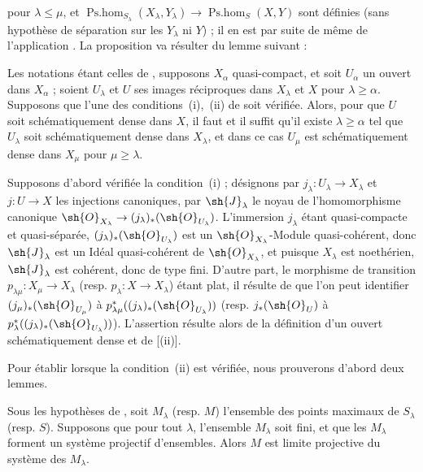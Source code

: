 pour $\lambda\leq\mu$, et $\operatorname{Ps.hom}_{S_\lambda}(X_\lambda,Y_\lambda)\to\operatorname{Ps.hom}_S(X,Y)$ sont définies (sans hypothèse de séparation sur les $Y_\lambda$ ni $Y$) ; il en est par suite de même de l'application .
La proposition va résulter du lemme suivant :

\begin{lemma}[20.3.8.2]
\label{IV.20.3.8.2}
Les notations étant celles de , supposons $X_\alpha$ quasi-compact, et soit $U_\alpha$ un ouvert dans $X_\alpha$ ; soient $U_\lambda$ et $U$ ses images réciproques dans $X_\lambda$ et $X$ pour $\lambda\geq\alpha$.
Supposons que l'une des conditions~(i),~(ii) de  soit vérifiée.
Alors, pour que $U$ soit schématiquement dense dans $X$, il faut et il suffit qu'il existe $\lambda\geq\alpha$ tel que $U_\lambda$ soit schématiquement dense dans $X_\lambda$, et dans ce cas $U_\mu$ est schématiquement dense dans $X_\mu$ pour $\mu\geq\lambda$.
\end{lemma}

Supposons d'abord vérifiée la condition~(i) ; désignons par $j_\lambda:U_\lambda\to X_\lambda$ et $j:U\to X$ les injections canoniques, par $\sh{J}_\lambda$ le noyau de l'homomorphisme canonique $\sh{O}_{X_\lambda}\to(j_\lambda)_*(\sh{O}_{U_\lambda})$.
L'immersion $j_\lambda$ étant quasi-compacte et quasi-séparée, $(j_\lambda)_*(\sh{O}_{U_\lambda})$ est un $\sh{O}_{X_\lambda}$-Module quasi-cohérent, donc $\sh{J}_\lambda$ est un Idéal quasi-cohérent de $\sh{O}_{X_\lambda}$, et puisque $X_\lambda$ est noethérien, $\sh{J}_\lambda$ est cohérent, donc de type fini.
D'autre part, le morphisme de transition $p_{\lambda\mu}:X_\mu\to X_\lambda$ (resp. $p_\lambda:X\to X_\lambda$) étant plat, il résulte de  que l'on peut identifier $(j_\mu)_*(\sh{O}_{U_\mu})$ à $p_{\lambda\mu}^*((j_\lambda)_*(\sh{O}_{U_\lambda}))$ (resp. $j_*(\sh{O}_U)$ à $p_\lambda^*((j_\lambda)_*(\sh{O}_{U_\lambda}))$).
L'assertion résulte alors de la définition d'un ouvert schématiquement dense et de [(ii)].

Pour établir  lorsque la condition~(ii) est vérifiée, nous prouverons d'abord deux lemmes.

\begin{lemma}[20.3.8.3]
\label{IV.20.3.8.3}
Sous les hypothèses de , soit $M_\lambda$ (resp. $M$) l'ensemble des points maximaux de $S_\lambda$ (resp. $S$).
Supposons que pour tout $\lambda$, l'ensemble $M_\lambda$ soit fini, et que les $M_\lambda$ forment un système projectif d'ensembles.
Alors $M$ est limite projective du système des $M_\lambda$.
\end{lemma}

